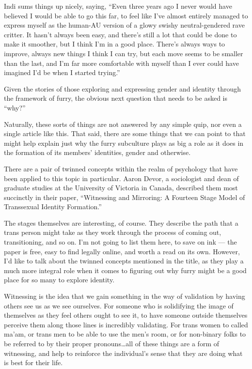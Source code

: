 Indi sums things up nicely, saying, ``Even three years ago I never would have believed I would be able to go this far, to feel like I've almost entirely managed to express myself as the human-AU version of a glowy swishy neutral-gendered rave critter.  It hasn't always been easy, and there's still a lot that could be done to make it smoother, but I think I'm in a good place. There's always ways to improve, always new things I think I can try, but each move seems to be smaller than the last, and I'm far more comfortable with myself than I ever could have imagined I'd be when I started trying.''

\secdiv

Given the stories of those exploring and expressing gender and identity through the framework of furry, the obvious next question that needs to be asked is ``why?''

Naturally, these sorts of things are not answered by any simple quip, nor even a single article like this.  That said, there are some things that we can point to that might help explain just why the furry subculture plays as big a role as it does in the formation of its members' identities, gender and otherwise.

There are a pair of twinned concepts within the realm of psychology that have been applied to this topic in particular.  Aaron Devor, a sociologist and dean of graduate studies at the University of Victoria in Canada, described them most succinctly in their paper, ``Witnessing and Mirroring: A Fourteen Stage Model of Transsexual Identity Formation.''

The stages themselves are interesting, of course.  They describe the path that a trans person might take as they work through the process of coming out, transitioning, and so on.  I'm not going to list them here, to save on ink --- the paper is free, easy to find legally online, and worth a read on its own.  However, I'd like to talk about the twinned concepts mentioned in the title, as they play a much more integral role when it comes to figuring out why furry might be a good place for so many to explore identity.

Witnessing is the idea that we gain something in the way of validation by having others see us as we see ourselves.  For someone who is solidifying the image of themselves as they feel others ought to see it, to have someone outside themselves perceive them along those lines is incredibly validating.  For trans women to called ma'am, or trans men to be able to use the men's room, or for non-binary folks to be referred to by their proper pronouns\ldots{}all of these things are a form of witnessing, and help to reinforce the individual's sense that they are doing what is best for their life.

